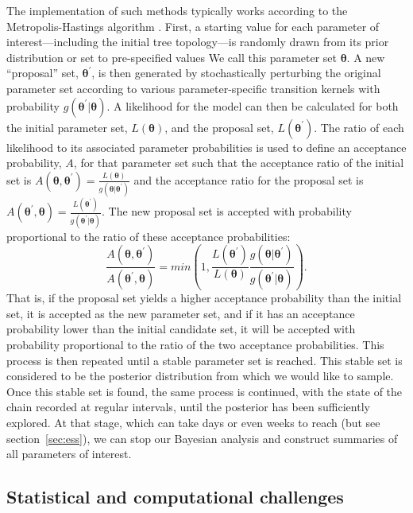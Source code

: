 The implementation of such methods typically works according to the Metropolis-Hastings algorithm \cite{metropolis1953equation, hastings1970monte}.
First, a starting value for each parameter of interest---including the initial tree topology---is randomly drawn from its prior distribution or set to pre-specified values
We call this parameter set $\mathbf{\theta}$.
A new ``proposal'' set, $\mathbf{\theta^\prime}$, is then generated by stochastically perturbing the original parameter set according to various parameter-specific transition kernels with probability $g(\mathbf{\theta^\prime}\vert\mathbf{\theta})$.
A likelihood for the model can then be calculated for both the initial parameter set, $L(\mathbf{\theta})$, and the proposal set, $L(\mathbf{\theta^{\prime}})$.
The ratio of each likelihood to its associated parameter probabilities is used to define an acceptance probability, $A$, for that parameter set such that the acceptance ratio of the initial set is $A(\mathbf{\theta}, \mathbf{\theta^{\prime}})=\frac{L(\mathbf{\theta})}{g(\mathbf{\theta}\vert\mathbf{\theta^\prime})}$ and the acceptance ratio for the proposal set is $A(\mathbf{\theta^\prime}, \mathbf{\theta})=\frac{L(\mathbf{\theta^\prime})}{g(\mathbf{\theta^\prime}\vert\mathbf{\theta})}$.
The new proposal set is accepted with probability proportional to the ratio of these acceptance probabilities:
$$
\frac{A(\mathbf{\theta}, \mathbf{\theta^{\prime}})}{A(\mathbf{\theta^\prime}, \mathbf{\theta})} = min(1,\frac{L(\mathbf{\theta^\prime})}{L(\mathbf{\theta})}\frac{g(\mathbf{\theta}\vert\mathbf{\theta^\prime})}{g(\mathbf{\theta^\prime}\vert\mathbf{\theta})}).
$$
That is, if the proposal set yields a higher acceptance probability than the initial set, it is accepted as the new parameter set, and if it has an acceptance probability lower than the initial candidate set, it will be accepted with probability proportional to the ratio of the two acceptance probabilities.
This process is then repeated until a stable parameter set is reached.
This stable set is considered to be the posterior distribution from which we would like to sample.
Once this stable set is found, the same process is continued, with the state of the chain recorded at regular intervals, until the posterior has been sufficiently explored.
At that stage, which can take days or even weeks to reach (but see section~\ref{sec:ess}), we can stop our Bayesian analysis and construct summaries of all parameters of interest.

\subsection{Statistical and computational challenges}

